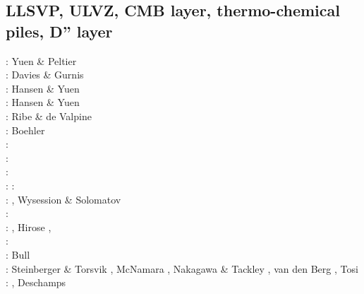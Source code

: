 \subsection{LLSVP, ULVZ, CMB layer, thermo-chemical piles, D'' layer}

\begin{scriptsize}
\nineteeneighty: Yuen \& Peltier \cite{yupe80}\\
\nineteeneightysix: Davies \& Gurnis \cite{dagu86}\\
\nineteeneightyeight: Hansen \& Yuen \cite{hayu88}\\
\nineteeneightynine: Hansen \& Yuen \cite{hayu89}\\
\nineteenninetyfour: Ribe \& de Valpine \cite{ride94}\\
\nineteenninetysix: Boehler \cite{boeh96}\\
\nineteenninetyseven: \cite{kell97}\\
\nineteenninetyeight: \cite{tack98b}\\
\twothousandone: \cite{soga01}\\
\twothousandtwo: \cite{somo02}\cite{tagh02}
\twothousandfour: \cite{mczh04}\cite{nata04}\\
\twothousandfive: \cite{mczh05a}\cite{nata05}\cite{nata05b}, Wysession \& Solomatov \cite{wyso05}\\
\twothousandsix: \cite{nata06}\\
\twothousandseven: \cite{heta07}\cite{moyu07}\cite{pelt07}, Hirose \etal \cite{hibl07}, \cite{yumc07}\\
\twothousandeight: \cite{gamc08}\cite{nata08}\cite{stho08}\\
\twothousandnine:  Bull \etal \cite{bumr09}\\
\twothousandten: Steinberger \& Torsvik \cite{stto10}, McNamara \etal \cite{mcgr10},
                 Nakagawa \& Tackley \cite{nata10}, van den Berg \etal \cite{vady10}, 
                 Tosi \etal \cite{toyc10}\\
\twothousandeleven: \cite{bowg11}\cite{talz11}\cite{vayj11}, Deschamps \etal \cite{dekt11}\\

\end{scriptsize}
